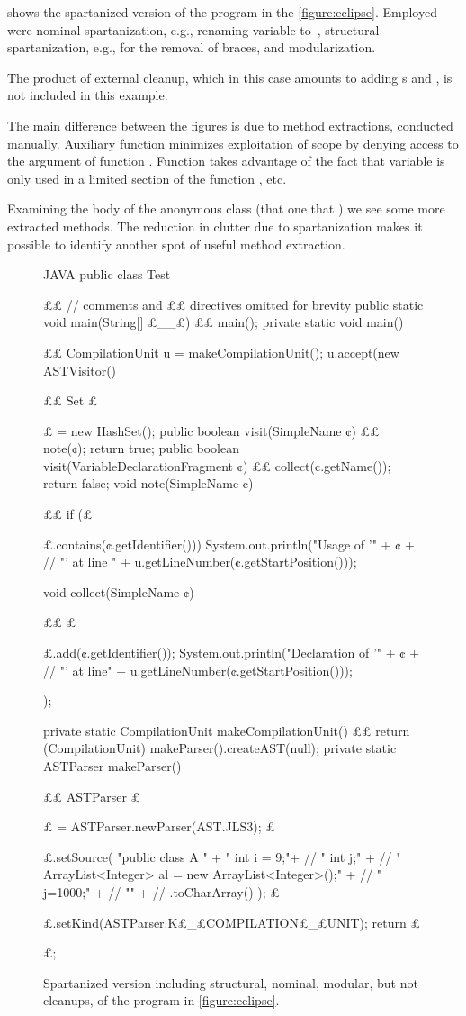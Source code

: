 \begin{description}
 shows the spartanized version of the program in
the \cref{figure:eclipse}. Employed were nominal spartanization, e.g., renaming
variable  to~\cc{\$}, structural spartanization, e.g., for the
removal of braces, and modularization.

The product of external cleanup, which in this case amounts to adding
s and , is not included in this example.

The main difference between the figures is due to method extractions, conducted
manually. Auxiliary  function  minimizes exploitation of
scope by denying access to the  argument of function .
Function  takes advantage of the fact that variable
 is only used in a limited section of the  function
, etc.

Examining the body of the anonymous class (that one that 
) we see some more extracted methods. The reduction in clutter
due to spartanization makes it possible to identify another spot of useful
method extraction.

\begin{figure}
  \caption{Spartanized version including structural, nominal, modular, but
    not cleanups, of the \Java program in \cref{figure:eclipse}.}
  \label{figure:eclipse:spartan}
  \begin{adjustbox}{max width = \columnwidth}
\begin{code}[minipage, width=1.13\columnwidth]{JAVA}
public class Test {££ // comments and ££ directives omitted for brevity
  public static void main(String[] £\_\_£) {££ main(); }
  private static void main() {££
    CompilationUnit u = makeCompilationUnit();
    u.accept(new ASTVisitor() {££
      Set £\ignore$£$ = new HashSet();
      public boolean visit(SimpleName ¢) {££
        note(¢);
        return true;
      }
      public boolean visit(VariableDeclarationFragment ¢) {££
        collect(¢.getName());
        return false;
      }
      void note(SimpleName ¢) {££
        if (£\ignore$£$.contains(¢.getIdentifier()))
          System.out.println("Usage of '" + ¢ + //
            "' at line " + u.getLineNumber(¢.getStartPosition()));
      }
      void collect(SimpleName ¢) {££
        £\ignore$£$.add(¢.getIdentifier());
        System.out.println("Declaration of '" + ¢ + //
          "' at line" + u.getLineNumber(¢.getStartPosition()));
      }
    });
  }
  private static CompilationUnit makeCompilationUnit() {££
    return (CompilationUnit) makeParser().createAST(null);
  }
  private static ASTParser makeParser() {££
    ASTParser £\ignore$£$ = ASTParser.newParser(AST.JLS3);
    £\ignore$£$.setSource(
      "public class A {\n" +
      " int i = 9;\n"+ //
      " int j;\n" + //
      " ArrayList<Integer> al = new ArrayList<Integer>();\n" + //
      " j=1000;\n" + // 
      "}\n" + //
      .toCharArray()
);
    £\ignore$£$.setKind(ASTParser.K£\_£COMPILATION£\_£UNIT);
    return £\ignore$£$;
  }
}
\end{code}
  \end{adjustbox}
\end{figure}


\end{description}
